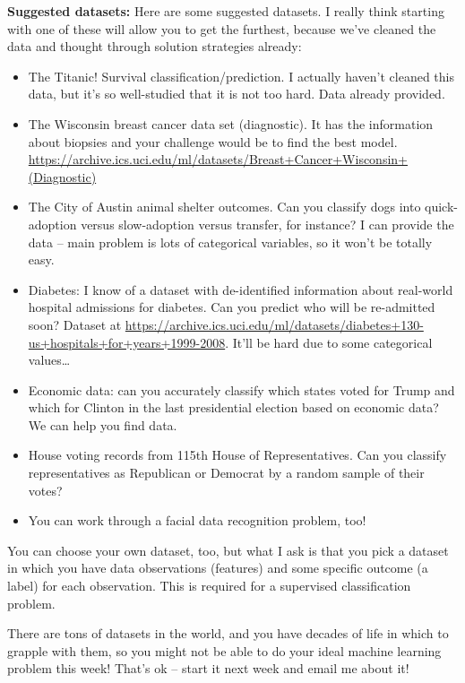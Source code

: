 \documentclass[10pt]{article}
\begin{document}
\textbf{Suggested datasets:} Here are some suggested datasets. I really think starting with one of these will allow you to get the furthest, because we've cleaned the data and thought through solution strategies already:
\begin{itemize}
\item The Titanic! Survival classification/prediction. I actually haven't cleaned this data, but it's so well-studied that it is not too hard. Data already provided.
\item The Wisconsin breast cancer data set (diagnostic). It has the information about biopsies and your challenge would be to find the best model. \url{https://archive.ics.uci.edu/ml/datasets/Breast+Cancer+Wisconsin+(Diagnostic)}
\item The City of Austin animal shelter outcomes. Can you classify dogs into quick-adoption versus slow-adoption versus transfer, for instance? I can provide the data -- main problem is lots of categorical variables, so it won't be totally easy.
\item Diabetes: I know of a dataset with de-identified information about real-world hospital admissions for diabetes. Can you predict who will be re-admitted soon? Dataset at \url{https://archive.ics.uci.edu/ml/datasets/diabetes+130-us+hospitals+for+years+1999-2008}. It'll be hard due to some categorical values\ldots
\item Economic data: can you accurately classify which states voted for Trump and which for Clinton in the last presidential election based on economic data? We can help you find data.
\item House voting records from 115th House of Representatives. Can you classify representatives as Republican or Democrat by a random sample of their votes?
\item You can work through a facial data recognition problem, too!
\end{itemize}

You can choose your own dataset, too, but what I ask is that you pick a dataset in which you have data observations (features) and some specific outcome (a label) for each observation. This is required for a supervised classification problem.

There are tons of datasets in the world, and you have decades of life in which to grapple with them, so you might not be able to do your ideal machine learning problem this week! That's ok -- start it next week and email me about it!

\bigskip
\end{document}
